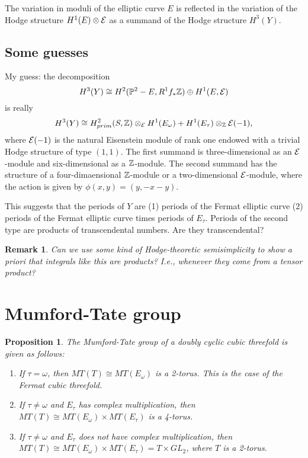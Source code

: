 \documentclass[11pt]{amsart}
\newtheorem{proposition}{Proposition}
\newtheorem{remark}{Remark}
\begin{document}
The variation in moduli of the elliptic curve $E$ is reflected in 
the variation of the Hodge structure $H^1(E)\otimes{\mathcal E}$ as a summand
of the Hodge structure $H^3(Y)$.


\subsection{Some guesses}

My guess: the decomposition
\[
   H^3(Y) \cong H^2({\mathbb P}^2 - E, R^1f_*{\mathbb Z}) \oplus H^1(E, {\mathcal E})
\]
is really
\[
H^3(Y) \cong 
   H^2_{prim}(S, {\mathbb Z})\otimes_{\mathcal E} H^1(E_\omega) + H^1(E_\tau)\otimes_{\mathbb Z} {\mathcal E}(-1),
\]
where ${\mathcal E}(-1)$  is the natural Eisenstein module of rank one endowed with a trivial
Hodge structure of type $(1,1)$.
The first summand is three-dimensional as an ${\mathcal E}$-module and six-dimensional as
a ${\mathbb Z}$-module.  The second summand has the structure of a four-dimaensional ${\mathbb Z}$-module
or a two-dimensional ${\mathcal E}$-module, where the action is given by $\phi(x,y) = (y , -x -y)$.

This suggests that the periods of $Y$ are (1) periods of the Fermat elliptic curve (2) periods
of the Fermat elliptic curve times periods of $E_\tau$.  Periods of the second type are products
of transcendental numbers.  Are they transcendental?  

\begin{remark}{Can we use some kind of Hodge-theoretic semisimplicity to show a priori
that integrals like this are products?  I.e., whenever they come from a tensor product?}
\end{remark}


\section{Mumford-Tate group}

\begin{proposition} The Mumford-Tate group of a doubly cyclic cubic threefold
is given as follows:

\begin{enumerate}

	\item If $\tau = \omega$, then $MT(T) \cong MT(E_\omega)$ is a 2-torus.  This is the case 
	of the Fermat cubic threefold.
	
	\item If $\tau \ne \omega$ and $E_\tau$ has complex multiplication, then 
	$MT(T) \cong MT(E_\omega)\times MT(E_\tau)$ is a 4-torus.
	
	\item If $\tau \ne \omega$ and $E_\tau$ does not have complex multiplication, then 
	$MT(T) \cong MT(E_\omega)\times MT(E_\tau) = T\times GL_2$, where
	$T$ is a 2-torus.

\end{enumerate}
\end{proposition}
\end{document}
